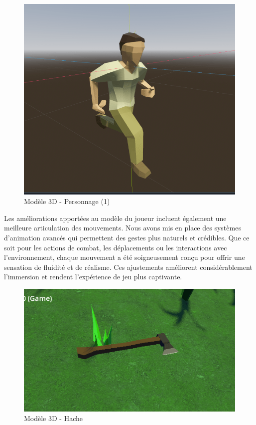 \documentclass[
	article,			%
	11pt,				%
	oneside,			%
	a4paper,			%
	chapter=TITLE,
	french,			%
	sumario=tradicional
	]{base_nt}
\begin{document}
\begin{figure}[ht]
	\caption{Modèle 3D - Personnage (1)}
	\centering
	\includegraphics[width=1\linewidth]{paper17.png}
	\legend{}
	
\end{figure}

Les améliorations apportées au modèle du joueur incluent également une meilleure articulation des mouvements. Nous avons mis en place des systèmes d'animation avancés qui permettent des gestes plus naturels et crédibles. Que ce soit pour les actions de combat, les déplacements ou les interactions avec l'environnement, chaque mouvement a été soigneusement conçu pour offrir une sensation de fluidité et de réalisme. Ces ajustements améliorent considérablement l'immersion et rendent l'expérience de jeu plus captivante.

\newpage

\begin{figure}[ht]
	\caption{Modèle 3D - Hache}
	\centering
	\includegraphics[width=1\linewidth]{paper18.png}
	\legend{}
	
\end{figure}
\end{document}
